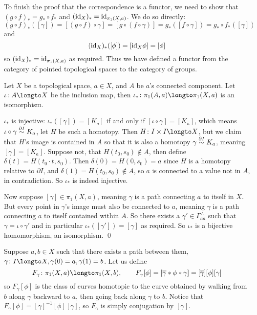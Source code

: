 To finish the proof that the correspondence is a functor, we need to show that $(g\circ f)_*=g_*\circ f_*$ and $({\rm id}_X)_*={\rm id}_{\pi_1(X,a)}$.
We do so directly:
$$ (g\circ f)_*([\gamma]) = [(g\circ f)\circ\gamma] = [g\circ(f\circ\gamma)] = g_*([f\circ\gamma]) = g_*\circ f_*([\gamma]) $$
and
$$ ({\rm id}_X)_*([\phi]) = [{\rm id}_X\phi] = [\phi] $$
so $({\rm id}_X)_*={\rm id}_{\pi_1(X,a)}$ as required.
Thus we have defined a functor from the category of pointed topological spaces to the category of groups.

\bprop

    Let $X$ be a topological space, $a\in X$, and $A$ be $a$'s connected component.
    Let $\iota\colon A\longto X$ be the inclusion map, then $\iota_*\colon\pi_1(A,a)\longto\pi_1(X,a)$ is an isomorphism.

\eprop

\Proof $\iota_*$ is injective: $\iota_*([\gamma])=[K_a]$ if and only if $[\iota\circ\gamma]=[K_a]$, which means $\iota\circ\gamma\hdi K_a$, let $H$ be such a homotopy.
Then $H\colon I\times I\longto X$, but we claim that $H$'s image is contained in $A$ so that it is also a homotopy $\gamma\hdi K_a$, meaning $[\gamma]=[K_a]$.
Suppose not, that $H(t_0,s_0)\notin A$, then define $\delta(t)=H(t_0\cdot t,s_0)$.
Then $\delta(0)=H(0,s_0)=a$ since $H$ is a homotopy relative to $\partial I$, and $\delta(1)=H(t_0,s_0)\notin A$, so $a$ is connected to a value not in $A$, in contradiction.
So $\iota_*$ is indeed injective.

Now suppose $[\gamma]\in\pi_1(X,a)$, meaning $\gamma$ is a path connecting $a$ to itself in $X$.
But every point in $\gamma$'s image must also be connected to $a$, meaning $\gamma$ is a path connecting $a$ to itself contained within $A$.
So there exists a $\gamma'\in\Gamma_{aa}^A$ such that $\gamma=\iota\circ\gamma'$ and in particular $\iota_*([\gamma'])=[\gamma]$ as required.
So $\iota_*$ is a bijective homomorphism, an isomorphism.
\qed

Suppose $a,b\in X$ such that there exists a path between them, $\gamma\colon I\longto X,\gamma(0)=a,\gamma(1)=b$.
Let us define
$$ F_\gamma\colon\pi_1(X,a)\longto\pi_1(X,b),\qquad F_\gamma[\phi] = [\overline\gamma*\phi*\gamma] =[\overline\gamma][\phi][\gamma] $$
so $F_\gamma[\phi]$ is the class of curves homotopic to the curve obtained by walking from $b$ along $\gamma$ backward to $a$, then going back along $\gamma$ to $b$.
Notice that $F_\gamma[\phi]=[\gamma]^{-1}[\phi][\gamma]$, so $F_\gamma$ is simply conjugation by $[\gamma]$.

